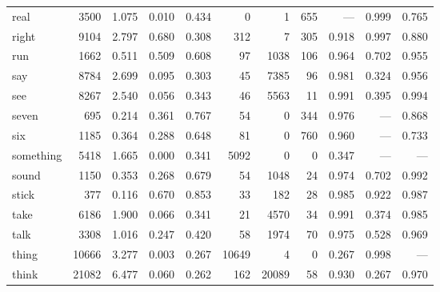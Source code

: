 \begin{landscape}
\begin{longtable}[c]{ l | r r c c | r r r | r r r }
  real       & 3500  & 1.075                   & 0.010           & 0.434      & 0         & 1           & 655          & —         & 0.999       & 0.765\\
  right      & 9104  & 2.797                   & 0.680           & 0.308      & 312       & 7           & 305          & 0.918     & 0.997       & 0.880\\
  run        & 1662  & 0.511                   & 0.509           & 0.608      & 97        & 1038        & 106          & 0.964     & 0.702       & 0.955\\
  say        & 8784  & 2.699                   & 0.095           & 0.303      & 45        & 7385        & 96           & 0.981     & 0.324       & 0.956\\
  see        & 8267  & 2.540                   & 0.056           & 0.343      & 46        & 5563        & 11           & 0.991     & 0.395       & 0.994\\
  seven      & 695   & 0.214                   & 0.361           & 0.767      & 54        & 0           & 344          & 0.976     & —           & 0.868\\
  six        & 1185  & 0.364                   & 0.288           & 0.648      & 81        & 0           & 760          & 0.960     & —           & 0.733\\
  something  & 5418  & 1.665                   & 0.000           & 0.341      & 5092      & 0           & 0            & 0.347     & —           & —\\
  sound      & 1150  & 0.353                   & 0.268           & 0.679      & 54        & 1048        & 24           & 0.974     & 0.702       & 0.992\\
  stick      & 377   & 0.116                   & 0.670           & 0.853      & 33        & 182         & 28           & 0.985     & 0.922       & 0.987\\
  take       & 6186  & 1.900                   & 0.066           & 0.341      & 21        & 4570        & 34           & 0.991     & 0.374       & 0.985\\
  talk       & 3308  & 1.016                   & 0.247           & 0.420      & 58        & 1974        & 70           & 0.975     & 0.528       & 0.969\\
  thing      & 10666 & 3.277                   & 0.003           & 0.267      & 10649     & 4           & 0            & 0.267     & 0.998       & —\\
  think      & 21082 & 6.477                   & 0.060           & 0.262      & 162       & 20089       & 58           & 0.930     & 0.267       & 0.970\\

\end{longtable}
\end{landscape}
